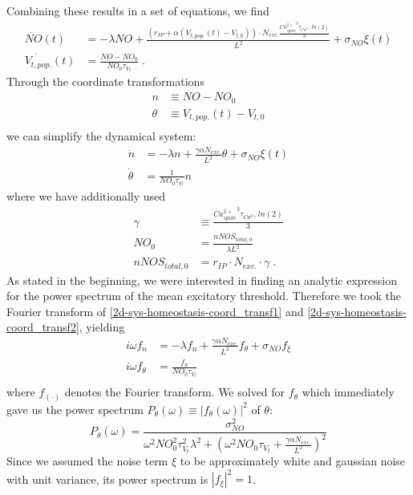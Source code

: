 \documentclass[10pt,a4paper]{article}
\begin{document}
Combining these results in a set of equations, we find
\begin{align}
\dot{NO}(t) &= -\lambda NO + \frac{(r_{IP} + \alpha(V_{t,pop.}(t)-V_{t,0}))\cdot N_{exc.}\frac{{Ca^{2+}_{spike}}^3 \tau_{Ca^{2+}}ln(2)}{3}}{L^2} + \sigma_{NO} \xi(t) \label{2d-sys-homeostasis1}\\
\dot{V_{t,pop.}}(t) &= \frac{NO-NO_0}{NO_0 \tau_{V_t}}\;. \label{2d-sys-homeostasis2}
\end{align}
Through the coordinate transformations
\begin{align}
n &\equiv NO-NO_0 \label{simplif_coord_transf1}\\
\theta &\equiv V_{t,pop.}(t)-V_{t,0} \label{simplif_coord_transf2}\\
\end{align}
we can simplify the dynamical system:
\begin{align}
\dot{n} &= -\lambda n + \frac{\gamma \alpha N_{exc.}}{L^2}\theta + \sigma_{NO} \xi(t) \label{2d-sys-homeostasis-coord_transf1}\\
\dot{\theta} &= \frac{1}{NO_0 \tau_{V_t}} n \label{2d-sys-homeostasis-coord_transf2}
\end{align}
where we have additionally used
\begin{align}
\gamma &\equiv \frac{{Ca^{2+}_{spike}}^3 \tau_{Ca^{2+}}ln(2)}{3} \label{2d-sys-fixed-points1}\\
NO_0 &= \frac{nNOS_{total,0}}{\lambda L^2} \label{2d-sys-fixed-points2}\\
nNOS_{total,0} &= r_{IP}\cdot N_{exc.} \cdot \gamma \; . \label{2d-sys-fixed-points3}
\end{align}
As stated in the beginning, we were interested in finding an analytic expression for the power spectrum of the mean excitatory threshold. Therefore we took the Fourier transform of \eqref{2d-sys-homeostasis-coord_transf1} and \eqref{2d-sys-homeostasis-coord_transf2}, yielding
\begin{align}
i\omega f_n &= - \lambda f_n + \frac{\gamma \alpha N_{exc.}}{L^2}f_\theta + \sigma_{NO} f_{\xi} \label{2d-sys-homeostasis-coord_transf_ft1}\\
i\omega f_\theta &= \frac{f_n}{NO_0\tau_{V_t}} \label{2d-sys-homeostasis-coord_transf_ft2} \\
\end{align}
where $f_{(\cdot)}$ denotes the Fourier transform. We solved for $f_\theta$ which immediately gave us the power spectrum $P_\theta (\omega) \equiv |f_\theta (\omega)|^2$ of $\theta$:
\begin{equation}
P_\theta (\omega) = \frac{\sigma_{NO}^2}{\omega^2 NO_0^2 \tau_{V_t}^2 \lambda^2 + \left( \omega^2 NO_0 \tau_{V_t} + \frac{\gamma \alpha N_{exc.}}{L^2}\right)^2} \label{Pow_Spec_Theta_Final}
\end{equation}
Since we assumed the noise term $\xi$ to be approximately white and gaussian noise with unit variance, its power spectrum is $|f_{\xi}|^2 = 1$.
\end{document}
